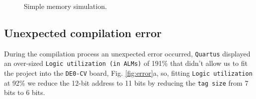 \documentclass[]{article}
\begin{document}
\begin{figure}[H]
	\centering
	\caption{Simple memory simulation.}
	\label{fig:cache4}
\end{figure}

\subsection{Unexpected compilation error}\label{error}
During the compilation process an unexpected error occurred, \verb|Quartus| displayed an over-sized \verb|Logic utilization (in ALMs)| of 191\% that didn't allow us to fit the project into the \verb|DE0-CV| board, Fig. \ref{fig:error}a, so, fitting \verb|Logic utilization| at 92\% we reduce the 12-bit address to 11 bits by reducing the \verb|tag size| from 7 bits to 6 bits.
\end{document}
